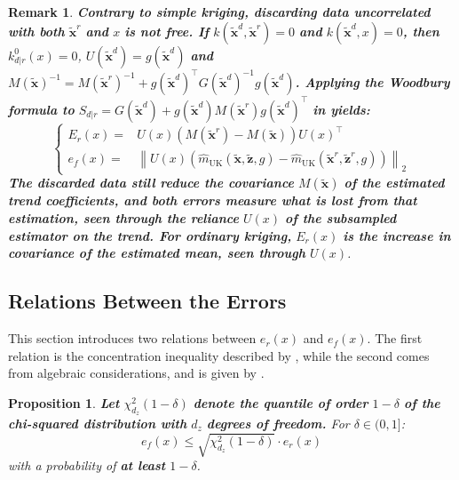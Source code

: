 \documentclass[preprint]{elsarticle}
\newtheorem{proposition}{Proposition}
\newtheorem{remark}{Remark}
\begin{document}
\begin{remark}
    \textbf{Contrary to simple kriging, discarding data uncorrelated with both} $\tilde{\mathbf{x}}^r$ \textbf{and} $x$ \textbf{is not free. If} $k(\tilde{\mathbf{x}}^d,\tilde{\mathbf{x}}^r)=0$ \textbf{and} $k(\tilde{\mathbf{x}}^d,x)=0$\textbf{, then} $k^0_{d|r}(x)=0$, $U(\tilde{\mathbf{x}}^d)=g(\tilde{\mathbf{x}}^d)$ \textbf{and} $M(\tilde{\mathbf{x}})^{-1}=M(\tilde{\mathbf{x}}^r)^{-1}+g(\tilde{\mathbf{x}}^d)^\top G(\tilde{\mathbf{x}}^d)^{-1}g(\tilde{\mathbf{x}}^d)$\textbf{. Applying the Woodbury formula \cite{bib:matrix-cookbook} to} $S_{d|r}=G(\tilde{\mathbf{x}}^d)+g(\tilde{\mathbf{x}}^d)M(\tilde{\mathbf{x}}^r)g(\tilde{\mathbf{x}}^d)^\top$ \textbf{in  yields:}
    \begin{equation*}
        \left\{\begin{aligned}
        E_r(x)=&U(x)\left(M(\tilde{\mathbf{x}}^r)-M(\tilde{\mathbf{x}})\right)U(x)^\top\\
        e_f(x)=&\left\|U(x)\left(\hat{m}_{\mathrm{UK}}(\tilde{\mathbf{x}},\tilde{\mathbf{z}},g)-\hat{m}_{\mathrm{UK}}(\tilde{\mathbf{x}}^r,\tilde{\mathbf{z}}^r,g)\right)\right\|_2
        \end{aligned}\right.
    \end{equation*}
    \textbf{The discarded data still reduce the covariance} $M(\tilde{\mathbf{x}})$ \textbf{of the estimated trend coefficients, and both errors measure what is lost from that estimation, seen through the reliance} $U(x)$ \textbf{of the subsampled estimator on the trend. For ordinary kriging,} $E_r(x)$ \textbf{is the increase in covariance of the estimated mean, seen through} $U(x)$.\label{rem:mean_floor}
\end{remark}

\subsection{Relations Between the Errors}

This section introduces two relations between $e_r(x)$ and $e_f(x)$. The first relation is the concentration inequality described by , while the second comes from algebraic considerations, and is given by .

\begin{proposition}
    \textbf{Let} $\chi^2_{d_z}(1-\delta)$ \textbf{denote the quantile of order} $1-\delta$ \textbf{of the chi-squared distribution with} $d_z$ \textbf{degrees of freedom.} For $\delta\in(0,1]$:
    \begin{equation*}
        e_f(x)\leq\sqrt{\chi^2_{d_z}(1-\delta)}\cdot e_r(x)
    \end{equation*}
    with a probability of \textbf{at least} $1-\delta$.\label{th:concentration_inequality}
\end{proposition}
\end{document}
